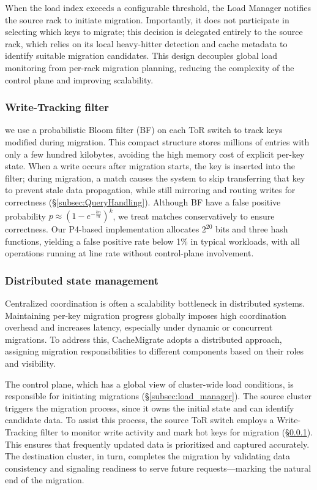 \documentclass[conference]{IEEEtran}
\begin{document}
When the load index exceeds a configurable threshold, the Load Manager notifies the source rack to initiate migration. Importantly, it does not participate in selecting which keys to migrate; this decision is delegated entirely to the source rack, which relies on its local heavy-hitter detection and cache metadata to identify suitable migration candidates. This design decouples global load monitoring from per-rack migration planning, reducing the complexity of the control plane and improving scalability.

\subsubsection{Write-Tracking filter}
\label{subsec:write_tracking}
we use a probabilistic Bloom filter (BF) on each ToR switch to track keys modified during migration. This compact structure stores millions of entries with only a few hundred kilobytes, avoiding the high memory cost of explicit per-key state. When a write occurs after migration starts, the key is inserted into the filter; during migration, a match causes the system to skip transferring that key to prevent stale data propagation, while still mirroring and routing writes for correctness (\S\ref{subsec:QueryHandling}). Although BF have a false positive probability \( p \approx \left(1 - e^{-\frac{k n}{m}}\right)^k \), we treat matches conservatively to ensure correctness. Our P4-based implementation allocates \( 2^{20} \) bits and three hash functions, yielding a false positive rate below 1\% in typical workloads, with all operations running at line rate without control-plane involvement.
 
\subsubsection{Distributed state management}
Centralized coordination is often a scalability bottleneck in distributed systems. Maintaining per-key migration progress globally imposes high coordination overhead and increases latency, especially under dynamic or concurrent migrations. To address this, CacheMigrate adopts a distributed approach, assigning migration responsibilities to different components based on their roles and visibility.

The control plane, which has a global view of cluster-wide load conditions, is responsible for initiating migrations (\S\ref{subsec:load_manager}). The source cluster triggers the migration process, since it owns the initial state and can identify candidate data. To assist this process, the source ToR switch employs a Write-Tracking filter to monitor write activity and mark hot keys for migration (\S\ref{subsec:write_tracking}). This ensures that frequently updated data is prioritized and captured accurately. The destination cluster, in turn, completes the migration by validating data consistency and signaling readiness to serve future requests—marking the natural end of the migration.
\end{document}
